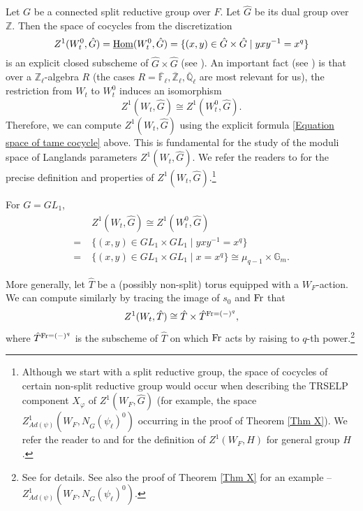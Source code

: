 	Let $G$ be a connected split reductive group over $F$. Let $\hat{G}$ be its dual group over $\mathbb{Z}$. Then the space of cocycles from the discretization
	\begin{equation}\label{Equation space of tame cocycle}
		Z^1(W_t^0, \hat{G})=\underline{\operatorname{\operatorname{Hom}}}(W_t^0, \hat{G})=\{(x, y) \in \hat{G} \times \hat{G}\;|\;yxy^{-1}=x^q\}
	\end{equation}
	is an explicit closed subscheme of $\hat{G} \times \hat{G}$ (see \cite[Section 3]{dat2022ihes}). An important fact (see \cite[Proposition 3.9]{dat2022ihes}) is that over a $\mathbb{Z}_{\ell}$-algebra $R$ (the cases $R=\overline{\mathbb{F}}_{\ell}, \overline{\mathbb{Z}}_{\ell}, \overline{\mathbb{Q}}_{\ell}$ are most relevant for us), the restriction from $W_t$ to $W_t^0$ induces an isomorphism
	$$Z^1(W_t, \hat{G}) \cong Z^1(W_t^0, \hat{G}).$$ 
	Therefore, we can compute $Z^1(W_t, \hat{G})$ using the explicit formula \eqref{Equation space of tame cocycle} above. This is fundamental for the study of the moduli space of Langlands parameters $Z^1(W_t, \hat{G})$. We refer the readers to \cite[Section 3, 4]{dat2022ihes} for the precise definition and properties of $Z^1(W_t, \hat{G})$.\footnote{Although we start with a split reductive group, the space of cocycles of certain non-split reductive group would occur when describing the TRSELP component $X_{\varphi}$ of $Z^1(W_F, \hat{G})$ (for example, the space $Z^1_{Ad(\psi)}(W_F, N_{\hat{G}}(\psi_{\ell})^0)$ occurring in the proof of Theorem \ref{Thm X}). We refer the reader to \cite{dat2022ihes} and \cite{dhkm2020moduli} for the definition of $Z^1(W_F, H)$ for general group $H$.} 
	
	\begin{eg}\label{Example GL_1}
		For $G=GL_1$,
	  \begin{equation}
	  \begin{aligned}
		&Z^1(W_t, \hat{G}) \cong Z^1(W_t^0, \hat{G})\\
		=\;&\{(x, y) \in GL_1 \times GL_1\;|\;yxy^{-1}=x^q\}\\
		=\;&\{(x, y) \in GL_1 \times GL_1\;|\;x=x^q\} \cong \mu_{q-1} \times \mathbb{G}_m.
	  \end{aligned}
      \end{equation}
      
      More generally, let $\hat{T}$ be a (possibly non-split) torus equipped with a $W_F$-action. We can compute similarly by tracing the image of $s_0$ and $\operatorname{Fr}$ that
      \begin{equation}\label{Equation: Z^1(W, T)}
      Z^1(W_t, \hat{T}) \cong \hat{T} \times \hat{T}^{\operatorname{Fr}=(-)^q},
      \end{equation} 
      where $\hat{T}^{\operatorname{Fr}=(-)^q}$ is the subscheme of $\hat{T}$ on which $\operatorname{Fr}$ acts by raising to $q$-th power.\footnote{See \cite[Example 3.14]{dat2022ihes} for details. See also the proof of Theorem \ref{Thm X} for an example -- $Z^1_{Ad(\psi)}(W_F, N_{\hat{G}}(\psi_{\ell})^0)$.}
	\end{eg}
	
